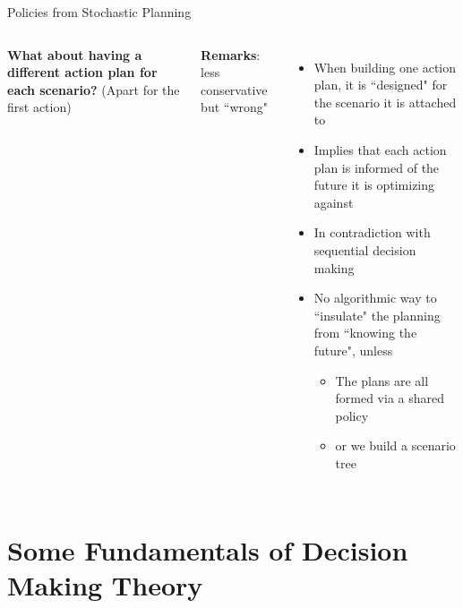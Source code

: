 \documentclass[lecture]{beamer}
\begin{document}
\begin{frame}{\normalsize Policies from Stochastic Planning}
\begin{columns}
\begin{center}
\textbf{What about having a different action plan for each scenario?} (Apart for the first action)
\end{center}
\textbf{Remarks}: less conservative but ``wrong"
\begin{itemize}
\scriptsize
\item When building one action plan, it is ``designed" for the scenario it is attached to
\item Implies that each action plan is informed of the future it is optimizing against
\item In contradiction with sequential decision making  
\item No algorithmic way to ``insulate" the planning from ``knowing the future", unless
\begin{itemize}
\scriptsize
\item The plans are all formed via a shared policy 
\item or we build a scenario tree
\end{itemize}
\end{itemize}
\end{columns}


\end{frame}



\section{Some Fundamentals of Decision Making Theory}
\end{document}
